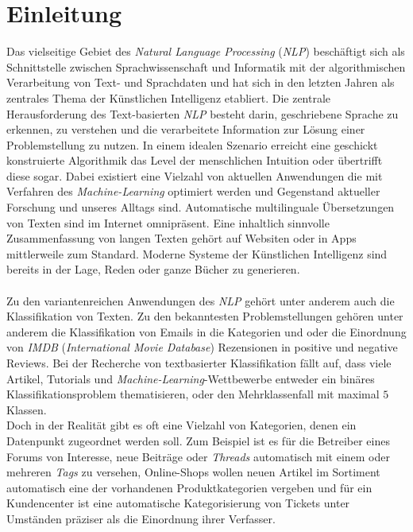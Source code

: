 \documentclass[a4paper,11pt]{article}
\begin{document}
\section{Einleitung}

Das vielseitige Gebiet des \textit{Natural Language Processing} (\textit{NLP}) beschäftigt sich als Schnittstelle zwischen Sprachwissenschaft und Informatik mit der algorithmischen Verarbeitung von Text- und Sprachdaten und hat sich in den letzten Jahren als zentrales Thema der Künstlichen Intelligenz etabliert. Die zentrale Herausforderung des Text-basierten \textit{NLP} besteht darin, geschriebene Sprache zu erkennen, zu verstehen und die verarbeitete Information zur Lösung einer Problemstellung zu nutzen. In einem idealen Szenario erreicht eine geschickt konstruierte Algorithmik das Level der menschlichen Intuition oder übertrifft diese sogar. Dabei existiert eine Vielzahl von aktuellen Anwendungen die mit Verfahren des \textit{Machine-Learning} optimiert werden und Gegenstand aktueller Forschung und unseres Alltags sind. Automatische multilinguale Übersetzungen von Texten sind im Internet omnipräsent. Eine inhaltlich sinnvolle Zusammenfassung von langen Texten gehört auf Websiten oder in Apps mittlerweile zum Standard. Moderne Systeme der Künstlichen Intelligenz sind bereits in der Lage, Reden oder ganze Bücher zu generieren. \\
\\
Zu den variantenreichen Anwendungen des \textit{NLP} gehört unter anderem auch die Klassifikation von Texten. Zu den bekanntesten Problemstellungen gehören unter anderem die Klassifikation von Emails in die Kategorien  und  oder die Einordnung von \textit{IMDB} (\textit{International Movie Database}) Rezensionen in positive und negative Reviews. Bei der Recherche von textbasierter Klassifikation fällt auf, dass viele Artikel, Tutorials und \textit{Machine-Learning}-Wettbewerbe entweder ein binäres Klassifikationsproblem thematisieren, oder den Mehrklassenfall mit maximal $5$ Klassen. \\
Doch in der Realität gibt es oft eine Vielzahl von Kategorien, denen ein Datenpunkt zugeordnet werden soll. Zum Beispiel ist es für die Betreiber eines Forums von Interesse, neue Beiträge oder \textit{Threads} automatisch mit einem oder mehreren \textit{Tags} zu versehen, Online-Shops wollen neuen Artikel im Sortiment automatisch eine der vorhandenen Produktkategorien vergeben und für ein Kundencenter ist eine automatische Kategorisierung von Tickets unter Umständen präziser als die Einordnung ihrer Verfasser. \\
\end{document}
